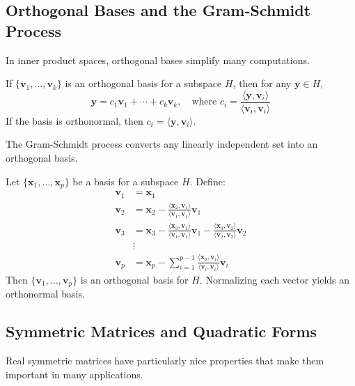 \documentclass[oneside]{book}
\begin{document}
\subsection{Orthogonal Bases and the Gram-Schmidt Process}

In inner product spaces, orthogonal bases simplify many computations.

\begin{theorem}
If $\{\mathbf{v}_1, \ldots, \mathbf{v}_k\}$ is an orthogonal basis for a subspace $H$, then for any $\mathbf{y} \in H$,
\[
\mathbf{y} = c_1 \mathbf{v}_1 + \cdots + c_k \mathbf{v}_k, \quad \text{where } c_i = \frac{\langle \mathbf{y}, \mathbf{v}_i \rangle}{\langle \mathbf{v}_i, \mathbf{v}_i \rangle}
\]
If the basis is orthonormal, then $c_i = \langle \mathbf{y}, \mathbf{v}_i \rangle$.
\end{theorem}

The Gram-Schmidt process converts any linearly independent set into an orthogonal basis.

\begin{theorem}
Let $\{\mathbf{x}_1, \ldots, \mathbf{x}_p\}$ be a basis for a subspace $H$. Define:
\begin{align*}
\mathbf{v}_1 &= \mathbf{x}_1 \\
\mathbf{v}_2 &= \mathbf{x}_2 - \frac{\langle \mathbf{x}_2, \mathbf{v}_1 \rangle}{\langle \mathbf{v}_1, \mathbf{v}_1 \rangle} \mathbf{v}_1 \\
\mathbf{v}_3 &= \mathbf{x}_3 - \frac{\langle \mathbf{x}_3, \mathbf{v}_1 \rangle}{\langle \mathbf{v}_1, \mathbf{v}_1 \rangle} \mathbf{v}_1 - \frac{\langle \mathbf{x}_3, \mathbf{v}_2 \rangle}{\langle \mathbf{v}_2, \mathbf{v}_2 \rangle} \mathbf{v}_2 \\
&\vdots \\
\mathbf{v}_p &= \mathbf{x}_p - \sum_{i=1}^{p-1} \frac{\langle \mathbf{x}_p, \mathbf{v}_i \rangle}{\langle \mathbf{v}_i, \mathbf{v}_i \rangle} \mathbf{v}_i
\end{align*}
Then $\{\mathbf{v}_1, \ldots, \mathbf{v}_p\}$ is an orthogonal basis for $H$. Normalizing each vector yields an orthonormal basis.
\end{theorem}

\subsection{Symmetric Matrices and Quadratic Forms}

Real symmetric matrices have particularly nice properties that make them important in many applications.
\end{document}

